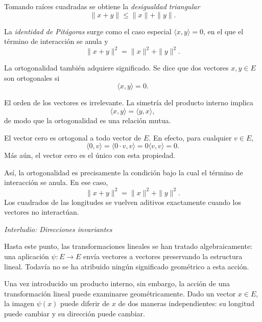 Tomando raíces cuadradas se obtiene la \emph{desigualdad triangular}
\[
\|x+y\|
\le
\|x\|
+
\|y\|.
\]

\medskip

La \textit{identidad de Pitágoras} surge como el caso especial
$\langle x,y \rangle = 0$,
en el que el término de interacción se anula y
\[
\|x+y\|^2
=
\|x\|^2
+
\|y\|^2.
\]

\medskip

La ortogonalidad también adquiere significado.
Se dice que dos vectores $x,y \in E$ son ortogonales si
\[
\langle x,y \rangle = 0.
\]

\medskip

El orden de los vectores es irrelevante.
La simetría del producto interno implica
\[
\langle x,y \rangle = \langle y,x \rangle,
\]
de modo que la ortogonalidad es una relación mutua.

\medskip

El vector cero es ortogonal a todo vector de $E$.
En efecto, para cualquier $v \in E$,
\[
\langle 0,v \rangle
=
\langle 0\cdot v, v \rangle
=
0\langle v,v \rangle
=
0.
\]
Más aún, el vector cero es el único con esta propiedad.

\medskip

Así, la ortogonalidad es precisamente la condición bajo la cual el término
de interacción se anula.
En ese caso,
\[
\|x+y\|^2 = \|x\|^2 + \|y\|^2.
\]
Los cuadrados de las longitudes se vuelven aditivos exactamente cuando los
vectores no interactúan.

\medskip


\textit{Interludio: Direcciones invariantes}

Hasta este punto, las transformaciones lineales se han tratado algebraicamente:
una aplicación $\psi : E \to E$ envía vectores a vectores preservando la
estructura lineal.
Todavía no se ha atribuido ningún significado geométrico a esta acción.

\medskip

Una vez introducido un producto interno, sin embargo, la acción de una
transformación lineal puede examinarse geométricamente.
Dado un vector $x \in E$, la imagen $\psi(x)$ puede diferir de $x$ de dos
maneras independientes: su longitud puede cambiar y su dirección puede cambiar.

